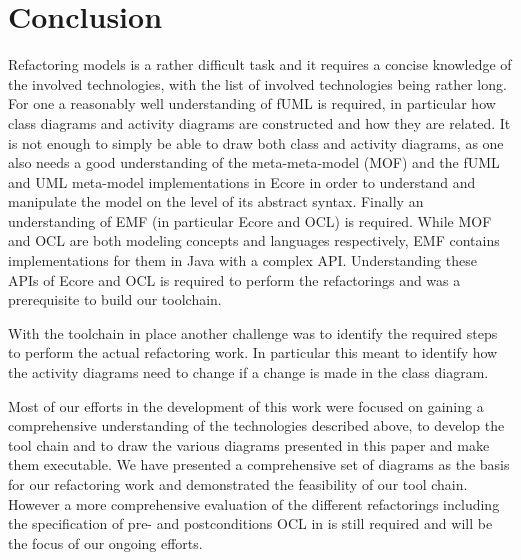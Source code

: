 \documentclass{llncs}
\begin{document}
\section{Conclusion}
\label{sec:conclusion}
Refactoring models is a rather difficult task and it requires a concise knowledge of the involved technologies, with
the list of involved technologies being rather long. For one a reasonably well understanding of fUML is required, in
particular how class diagrams and activity diagrams are constructed and how they are related. It is not enough to simply
be able to draw both class and activity diagrams, as one also needs a good understanding of the meta-meta-model (MOF) and
the fUML and UML meta-model implementations in Ecore in order to understand and manipulate the model on the level of its 
abstract syntax. Finally an understanding of EMF (in particular Ecore and OCL) is required. While MOF and OCL are both 
modeling concepts and languages respectively, EMF contains implementations for them in Java with a complex API. 
Understanding these APIs of Ecore and OCL is required to perform the refactorings and was a prerequisite to build
our toolchain.

With the toolchain in place another challenge was to identify the required steps to perform the actual refactoring work.
In particular this meant to identify how the activity diagrams need to change if a change is made in the class
diagram.

Most of our efforts in the development of this work were focused on gaining a comprehensive understanding of the
technologies described above, to develop the tool chain and to draw the various diagrams presented in this paper and make 
them executable. We have presented a comprehensive set of diagrams as the basis for our refactoring work and demonstrated 
the feasibility of our tool chain. However a more comprehensive evaluation of the different refactorings including the 
specification of pre- and postconditions OCL in is still required and will be the focus of our ongoing efforts.

\newpage


\end{document}
